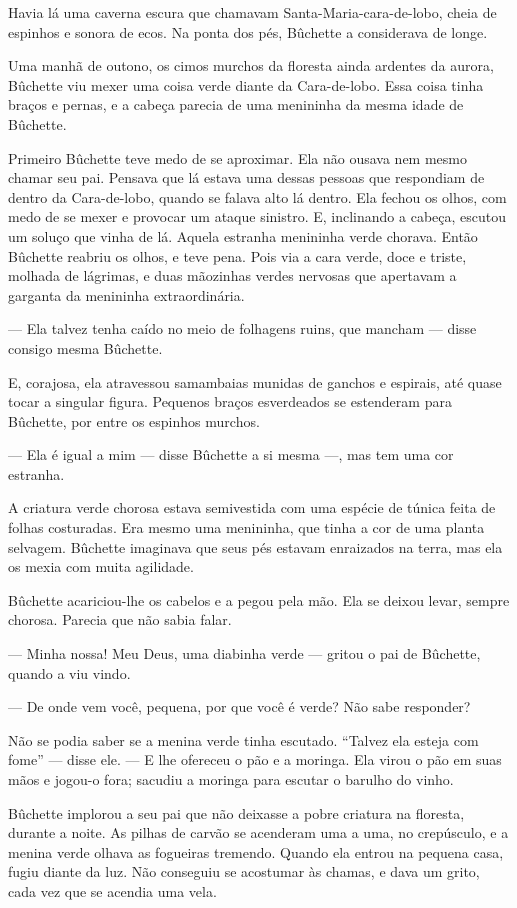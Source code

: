Havia lá uma caverna escura que chamavam Santa-Maria-cara-de-lobo,
cheia de espinhos e sonora de ecos. Na ponta dos pés, Bûchette
a considerava de longe.

Uma manhã de outono, os cimos murchos da floresta ainda ardentes da
aurora, Bûchette viu mexer uma coisa verde diante da Cara-de-lobo. Essa
coisa tinha braços e pernas, e a cabeça parecia de uma menininha da mesma
idade de Bûchette.

Primeiro Bûchette teve medo de se aproximar. Ela não ousava nem
mesmo chamar seu pai. Pensava que lá estava uma dessas pessoas que
respondiam de dentro da Cara-de-lobo, quando se falava alto lá dentro. Ela
fechou os olhos, com medo de se mexer e provocar um ataque sinistro. E,
inclinando a cabeça, escutou um soluço que vinha de lá. Aquela estranha
menininha verde chorava. Então Bûchette reabriu os olhos, e teve pena.
Pois via a cara verde, doce e triste, molhada de lágrimas, e duas
mãozinhas verdes nervosas que apertavam a garganta da menininha
extraordinária.

--- Ela talvez tenha caído no meio de folhagens ruins, que mancham ---
disse consigo mesma Bûchette.

E, corajosa, ela atravessou samambaias munidas de ganchos e espirais,
até quase tocar a singular figura. Pequenos braços esverdeados se
estenderam para Bûchette, por entre os espinhos murchos.

--- Ela é igual a mim --- disse Bûchette a si mesma ---,  mas tem uma cor estranha.

A criatura verde chorosa estava semivestida com uma espécie de túnica
feita de folhas costuradas. Era mesmo uma menininha, que tinha a cor de
uma planta selvagem. Bûchette imaginava que seus pés estavam enraizados na
terra, mas ela os mexia com muita agilidade.

Bûchette acariciou-lhe os cabelos e a pegou pela mão. Ela se deixou
levar, sempre chorosa. Parecia que não sabia falar.

--- Minha nossa! Meu Deus, uma diabinha verde --- gritou o pai de Bûchette,
quando a viu vindo.

--- De onde vem você, pequena, por que você é verde? Não sabe responder?

Não se podia saber se a menina verde tinha escutado. “Talvez ela esteja
com fome” --- disse ele. --- E lhe ofereceu o pão e a moringa. Ela virou o pão em
suas mãos e jogou-o fora; sacudiu a moringa para escutar o barulho do
vinho.

Bûchette implorou a seu pai que não deixasse a pobre criatura na
floresta, durante a noite. As pilhas de carvão se acenderam uma a uma, no
crepúsculo, e a menina verde olhava as fogueiras tremendo. Quando ela
entrou na pequena casa, fugiu diante da luz. Não conseguiu se acostumar às
chamas, e dava um grito, cada vez que se acendia uma vela.

